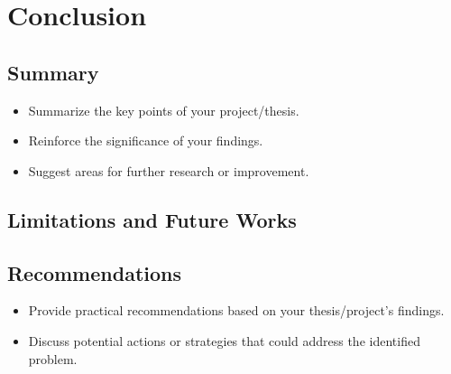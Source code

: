 \chapter{Conclusion}
\section{Summary}
\begin{itemize}
    \item Summarize the key points of your project/thesis.
    \item Reinforce the significance of your findings.
    \item Suggest areas for further research or improvement.
\end{itemize}

\section{Limitations and Future Works}


\section{Recommendations}

\begin{itemize}
    \item Provide practical recommendations based on your thesis/project's findings.
    \item Discuss potential actions or strategies that could address the identified problem.
\end{itemize}
